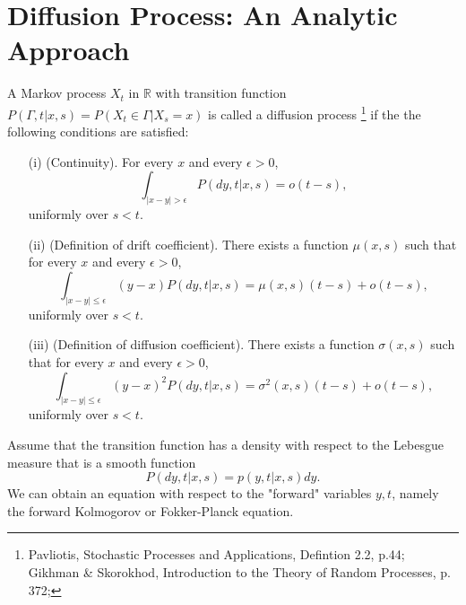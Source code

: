 \section{Diffusion Process: An Analytic Approach} \label{S:diff_ana}

\begin{definition}
A Markov process $X_t$ in $\mathbb{R}$ with transition function 
$P(\Gamma,t|x,s)=P(X_t\in\Gamma | X_s=x)$
is called a diffusion process
\footnote{Pavliotis, Stochastic Processes and Applications, Defintion 2.2, p.44;
  Gikhman \& Skorokhod, Introduction to the Theory of Random Processes, p. 372;}
if the the following conditions are satisfied:
\begin{enumerate}
  \item[(i)] (Continuity). For every $x$ and every $\epsilon>0$,
    \begin{equation}
      \int_{|x-y|>\epsilon} P(dy,t|x,s) = o(t-s),
    \end{equation}
    uniformly over $s<t$.
  \item[(ii)] (Definition of drift coefficient). There exists a function
    $\mu(x,s)$ such that for every $x$ and every $\epsilon>0$,
    \begin{equation}
      \int_{|x-y|\le\epsilon} (y-x) P(dy,t|x,s) = \mu(x,s)(t-s) + o(t-s),
    \end{equation}
    uniformly over $s<t$.
  \item[(iii)] (Definition of diffusion coefficient). There exists a function
    $\sigma(x,s)$ such that for every $x$ and every $\epsilon>0$,
    \begin{equation}
      \int_{|x-y|\le\epsilon} (y-x)^2 P(dy,t|x,s) = \sigma^2(x,s)(t-s) + o(t-s),
    \end{equation}
    uniformly over $s<t$.
\end{enumerate}
\end{definition}

Assume that the transition function has a density  with respect to the Lebesgue
measure that is a smooth function
\[
  P(dy,t|x,s) = p(y,t|x,s)dy.
\]
We can obtain an equation with respect to the "forward" variables $y,t$, namely
the forward Kolmogorov or Fokker-Planck equation.

